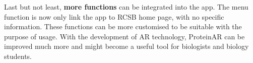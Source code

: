Last but not least, \textbf{more functions} can be integrated into the app. The menu function is now only link the app to RCSB home page, with no specific information. These functions can be more customised to be suitable with the purpose of usage. 
With the development of AR technology, ProteinAR can be improved much more and might become a useful tool for biologists and biology students. 

